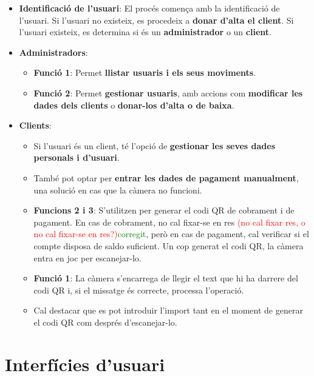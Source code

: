 \documentclass[a4paper,12pt,twoside]{ThesisStyle}
\newcommand{\pau}[1]{\textcolor{red}{#1}}
\newcommand{\sudan}[1]{\textcolor{green}{#1}}
\begin{document}
\begin{itemize}
    \item \textbf{Identificació de l'usuari}: El procés comença amb la identificació de l'usuari. Si l'usuari no existeix, es procedeix a \textbf{donar d'alta el client}. Si l'usuari existeix, es determina si és un \textbf{administrador} o un \textbf{client}.
    
    \item \textbf{Administradors}: 
    \begin{itemize}
        \item \textbf{Funció 1}: Permet \textbf{llistar usuaris i els seus moviments}.
        \item \textbf{Funció 2}: Permet \textbf{gestionar usuaris}, amb accions com \textbf{modificar les dades dels clients} o \textbf{donar-los d'alta o de baixa}.
    \end{itemize}
    
    \item \textbf{Clients}: 
    \begin{itemize}
        \item Si l'usuari és un client, té l'opció de \textbf{gestionar les seves dades personals i d'usuari}.
        \item També pot optar per \textbf{entrar les dades de pagament manualment}, una solució en cas que la càmera no funcioni.
        \item \textbf{Funcions 2 i 3}: S'utilitzen per generar el codi QR de cobrament i de pagament. En cas de cobrament, no cal fixar-se en res \pau{(no cal fixar res, o no cal fixar-se en res?)}\sudan{corregit}, però en cas de pagament, cal verificar si el compte disposa de saldo suficient. Un cop generat el codi QR, la càmera entra en joc per escanejar-lo.
        \item \textbf{Funció 1}: La càmera s'encarrega de llegir el text que hi ha darrere del codi QR i, si el missatge és correcte, processa l'operació.
        \item Cal destacar que es pot introduir l'import tant en el moment de generar el codi QR com després d'escanejar-lo.
    \end{itemize}
\end{itemize}




\section{Interfícies d'usuari}
\label{ sec: Interfícies d'usuari }
\end{document}
